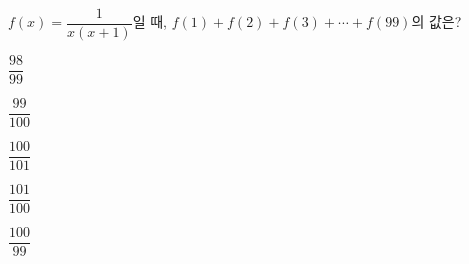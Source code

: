 \hspace*{2mm}\begin{minipage}[t]{\dimexpr\linewidth-2mm\relax}\vspace{0pt}
$f(x)=\dfrac{1}{x(x+1)}$일 때, $f(1)+f(2)+f(3)+\cdots+f(99)$의 값은?
\begin{choices32}{\rule[-3ex]{0pt}{8ex}$\dfrac{98}{99}$}{\rule[-3ex]{0pt}{8ex}$\dfrac{99}{100}$}{\rule[-3ex]{0pt}{8ex}$\dfrac{100}{101}$}{\rule[-3ex]{0pt}{8ex}$\dfrac{101}{100}$}{\rule[-3ex]{0pt}{8ex}$\dfrac{100}{99}$}\end{choices32}\end{minipage}
